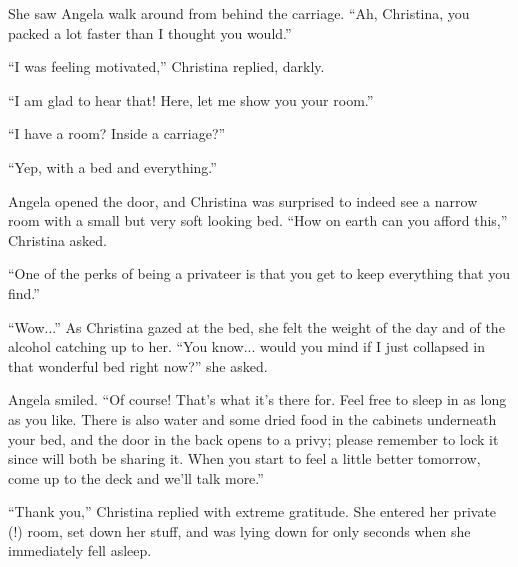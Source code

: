 \documentclass[showtrims,b6paper,draft,10pt]{memoir}
\begin{document}
She saw Angela walk around from behind the carriage.  ``Ah, Christina, you packed a lot faster than I thought you would.''

``I was feeling motivated,'' Christina replied, darkly.

``I am glad to hear that!  Here, let me show you your room.''

``I have a room?  Inside a carriage?''

``Yep, with a bed and everything.''

Angela opened the door, and Christina was surprised to indeed see a narrow room with a small but very soft looking bed.  ``How on earth can you afford this,'' Christina asked.

``One of the perks of being a privateer is that you get to keep everything that you find.''

``Wow...'' As Christina gazed at the bed, she felt the weight of the day and of the alcohol catching up to her.  ``You know... would you mind if I just collapsed in that wonderful bed right now?''  she asked.

Angela smiled.  ``Of course!  That's what it's there for.  Feel free to sleep in as long as you like.  There is also water and some dried food in the cabinets underneath your bed, and the door in the back opens to a privy;  please remember to lock it since will both be sharing it.  When you start to feel a little better tomorrow, come up to the deck and we'll talk more.''

``Thank you,'' Christina replied with extreme gratitude.  She entered her private (!) room, set down her stuff, and was lying down for only seconds when she immediately fell asleep.
\appendix{}
\end{document}
